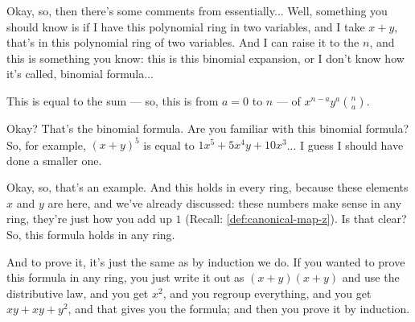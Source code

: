 \begin{speech}[00:01:55 - 00:03:48]
Okay, so, then there's some comments from essentially... Well, something you should know is if I have this polynomial ring in two variables,  and I take $x + y$, that's in this polynomial ring of two variables. And I can raise it to the $n$,  and this is something you know: this is this binomial expansion, or I don't know how it's called, binomial formula... 

This is equal to the sum --- so, this is from $a = 0$ to $n$ ---  of $x^{n-a} y^a \binom{n}{a}$. 

Okay? That's the binomial formula. Are you familiar with this binomial formula? So, for example, $(x+y)^5$  is equal to $1 x^5 + 5 x^4 y + 10 x^3$...  I guess I should have done a smaller one. 

Okay, so, that's an example. And this holds in every ring, because these elements $x$ and $y$ are here, and we've already discussed: these numbers make sense in any ring, they're just how you add up $1$ (Recall: \cref{def:canonical-map-z}). Is that clear? So, this formula holds in any ring. 

And to prove it, it's just the same as by induction we do. If you wanted to prove this formula in any ring, you just write it out as $(x+y)(x+y)$ and use the distributive law, and you get $x^2$, and you regroup everything, and you get $xy + xy + y^2$, and that gives you the formula; and then you prove it by induction. 
\end{speech}

